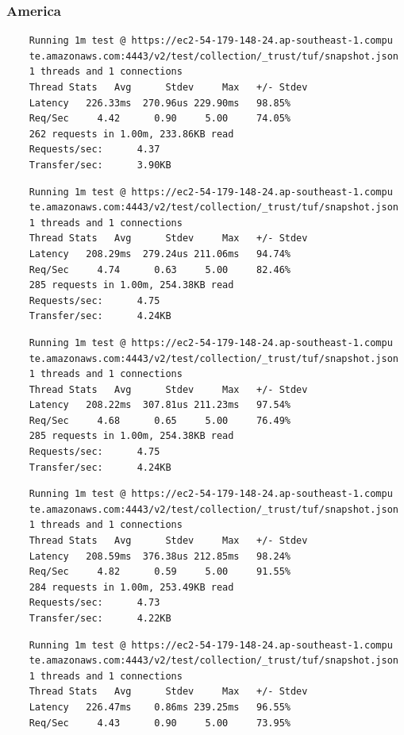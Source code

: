 \documentclass[a4paper,12pt]{article}
\newcounter{subsubsubsection}[subsubsection]
\begin{document}
{{	\subsubsection{America}
	\begin{verbatim}
	Running 1m test @ https://ec2-54-179-148-24.ap-southeast-1.compu
	te.amazonaws.com:4443/v2/test/collection/_trust/tuf/snapshot.json
	1 threads and 1 connections
	Thread Stats   Avg      Stdev     Max   +/- Stdev
	Latency   226.33ms  270.96us 229.90ms   98.85%
	Req/Sec     4.42      0.90     5.00     74.05%
	262 requests in 1.00m, 233.86KB read
	Requests/sec:      4.37
	Transfer/sec:      3.90KB
	\end{verbatim}
	\begin{verbatim}
	Running 1m test @ https://ec2-54-179-148-24.ap-southeast-1.compu
	te.amazonaws.com:4443/v2/test/collection/_trust/tuf/snapshot.json
	1 threads and 1 connections
	Thread Stats   Avg      Stdev     Max   +/- Stdev
	Latency   208.29ms  279.24us 211.06ms   94.74%
	Req/Sec     4.74      0.63     5.00     82.46%
	285 requests in 1.00m, 254.38KB read
	Requests/sec:      4.75
	Transfer/sec:      4.24KB
	\end{verbatim}
	\begin{verbatim}
	Running 1m test @ https://ec2-54-179-148-24.ap-southeast-1.compu
	te.amazonaws.com:4443/v2/test/collection/_trust/tuf/snapshot.json
	1 threads and 1 connections
	Thread Stats   Avg      Stdev     Max   +/- Stdev
	Latency   208.22ms  307.81us 211.23ms   97.54%
	Req/Sec     4.68      0.65     5.00     76.49%
	285 requests in 1.00m, 254.38KB read
	Requests/sec:      4.75
	Transfer/sec:      4.24KB
	\end{verbatim}
	\begin{verbatim}
	Running 1m test @ https://ec2-54-179-148-24.ap-southeast-1.compu
	te.amazonaws.com:4443/v2/test/collection/_trust/tuf/snapshot.json
	1 threads and 1 connections
	Thread Stats   Avg      Stdev     Max   +/- Stdev
	Latency   208.59ms  376.38us 212.85ms   98.24%
	Req/Sec     4.82      0.59     5.00     91.55%
	284 requests in 1.00m, 253.49KB read
	Requests/sec:      4.73
	Transfer/sec:      4.22KB
	\end{verbatim}
	\newpage
	\begin{verbatim}
	Running 1m test @ https://ec2-54-179-148-24.ap-southeast-1.compu
	te.amazonaws.com:4443/v2/test/collection/_trust/tuf/snapshot.json
	1 threads and 1 connections
	Thread Stats   Avg      Stdev     Max   +/- Stdev
	Latency   226.47ms    0.86ms 239.25ms   96.55%
	Req/Sec     4.43      0.90     5.00     73.95%

\end{verbatim}}}
\end{document}
